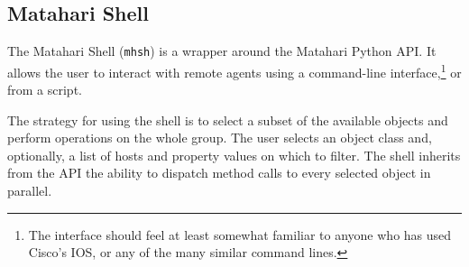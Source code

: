 \documentclass{tufte-handout}
\begin{document}
\subsection{Matahari Shell}

The Matahari Shell (\texttt{mhsh}) is a wrapper around the Matahari Python API. It allows the user to interact with remote agents using a command-line interface,\footnote{The interface should feel at least somewhat familiar to anyone who has used Cisco's IOS, or any of the many similar command lines.} or from a script.

The strategy for using the shell is to select a subset of the available objects and perform operations on the whole group.
The user selects an object class and, optionally, a list of hosts and property values on which to filter.
The shell inherits from the API the ability to dispatch method calls to every selected object in parallel.
\end{document}
